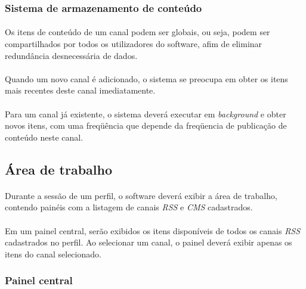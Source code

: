 \documentclass[a4paper,12pt]{article}
\def\cms{\emph{CMS}}
\def\rss{\emph{RSS}}
\begin{document}
\paragraph{}

\subsubsection{Sistema de armazenamento de conteúdo}

\paragraph{}
Os itens de conteúdo de um canal podem ser globais, ou seja, podem ser compartilhados por todos os utilizadores do software, afim de eliminar redundância desnecessária de dados.
\paragraph{}
Quando um novo canal é adicionado, o sistema se preocupa em obter os itens mais recentes deste canal imediatamente.
\paragraph{}
Para um canal já existente, o sistema deverá executar em \emph{background} e obter novos itens, com uma freqüência que depende da freqüencia de publicação de conteúdo neste canal.

\subsection{Área de trabalho}

\paragraph{}
Durante a sessão de um perfil, o software deverá exibir a área de trabalho, contendo painéis com a listagem de canais \rss{} e \cms{} cadastrados.
\paragraph{}
Em um painel central, serão exibidos os itens disponíveis de todos os canais \rss{} cadastrados no perfil. Ao selecionar um canal, o painel deverá exibir apenas os itens do canal selecionado.

\subsubsection{Painel central}
\end{document}
